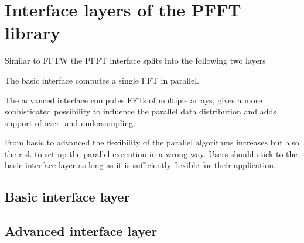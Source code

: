 \chapter{Interface layers of the PFFT library}\label{chap:api}

Similar to FFTW the PFFT interface splits into the following two layers
\begin{compactitem}
  \item The basic interface computes a single FFT in parallel.
  \item The advanced interface computes FFTs of multiple arrays, gives a more sophisticated possibility
        to influence the parallel data distribution and adds support of over- and undersampling.
\end{compactitem}
From basic to advanced the flexibility of the parallel algorithms increases but also the risk to set up the
parallel execution in a wrong way. Users should stick to the basic interface layer as long as it is sufficiently
flexible for their application.

\section{Basic interface layer}



\section{Advanced interface layer}


